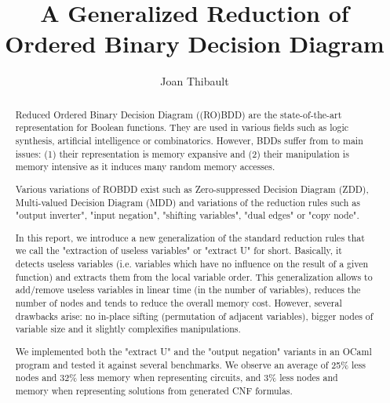 \documentclass[a4paper,10pt]{article}
\title{A Generalized Reduction of Ordered Binary Decision Diagram}
\author{Joan Thibault}
\begin{document}
\maketitle
\begin{abstract}
Reduced Ordered Binary Decision Diagram ((RO)BDD)\cite{Bryant1986, Somenzi1999} are the state-of-the-art representation for Boolean functions.
They are used in various fields such as logic synthesis, artificial intelligence or combinatorics.
However, BDDs suffer from to main issues: (1) their representation is memory expansive and (2) their manipulation is memory intensive as it induces many random memory accesses.


Various variations of ROBDD exist such as Zero-suppressed Decision Diagram (ZDD)\cite{IntroZDD}, Multi-valued Decision Diagram (MDD)\cite{IntroMDD, IntroMddRolf} and variations of the reduction rules such as "output inverter"\cite{BryantVariantN}, "input negation"\cite{MinatoVariants}, "shifting variables"\cite{MinatoVariants}, "dual edges"\cite{RolfVariantDual} or "copy node"\cite{RolfVariantCopy}.


In this report, we introduce a new generalization of the standard reduction rules that we call the "extraction of useless variables" or "extract U" for short.
Basically, it detects useless variables (i.e. variables which have no influence on the result of a given function) and extracts them from the local variable order.
This generalization allows to add/remove useless variables in linear time (in the number of variables), reduces the number of nodes and tends to reduce the overall memory cost.
However, several drawbacks arise: no in-place sifting (permutation of adjacent variables), bigger nodes of variable size and it slightly complexifies manipulations.


We implemented both the "extract U" and the "output negation" variants in an OCaml program and tested it against several benchmarks\cite{BenchSatlib, BenchLgsynth91, BenchIscas99}.
We observe an average of 25\% less nodes and 32\% less memory when representing circuits, and 3\% less nodes and memory when representing solutions from generated CNF formulas.
\end{abstract}


\newpage
\tableofcontents
\newpage
\newcommand{\shannon}[3]{#1 \longrightarrow_S #2, #3}
\newcommand{\N}{\mathbb{N}}%
\newcommand{\B}{\mathbb{B}}%
\newcommand{\F}{\mathbb{F}}%
\newcommand{\Y}{\mathbb{Y}}%
\newcommand{\I}{\mathbb{I}}%
\newcommand{\Ynode}{\Y\mathtt{-node}}
\end{document}

